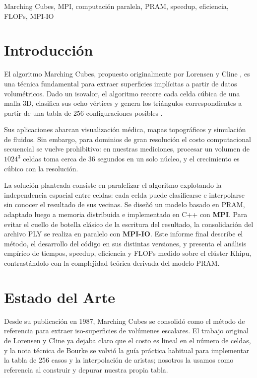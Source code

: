 \documentclass[conference]{IEEEtran}
\begin{document}
\begin{IEEEkeywords}
Marching Cubes, MPI, computación paralela, PRAM, speedup, eficiencia, FLOPs, MPI-IO
\end{IEEEkeywords}

\section{Introducción}

El algoritmo Marching Cubes, propuesto originalmente por Lorensen y Cline \cite{b1}, es una técnica fundamental para extraer superficies implícitas a partir de datos volumétricos. Dado un isovalor, el algoritmo recorre cada celda cúbica de una malla 3D, clasifica sus ocho vértices y genera los triángulos correspondientes a partir de una tabla de 256 configuraciones posibles \cite{b2}.

Sus aplicaciones abarcan visualización médica, mapas topográficos y simulación de fluidos. Sin embargo, para dominios de gran resolución el costo computacional secuencial se vuelve prohibitivo: en nuestras mediciones, procesar un volumen de $1024^3$ celdas toma cerca de 36 segundos en un solo núcleo, y el crecimiento es cúbico con la resolución.

La solución planteada consiste en paralelizar el algoritmo explotando la independencia espacial entre celdas: cada celda puede clasificarse e interpolarse sin conocer el resultado de sus vecinas. Se diseñó un modelo basado en PRAM, adaptado luego a memoria distribuida e implementado en C++ con \textbf{MPI}. Para evitar el cuello de botella clásico de la escritura del resultado, la consolidación del archivo PLY se realiza en paralelo con \textbf{MPI-IO}. Este informe final describe el método, el desarrollo del código en sus distintas versiones, y presenta el análisis empírico de tiempos, speedup, eficiencia y FLOPs medido sobre el clúster Khipu, contrastándolo con la complejidad teórica derivada del modelo PRAM.

\section{Estado del Arte}

Desde su publicación en 1987, Marching Cubes se consolidó como el método de referencia para extraer iso-superficies de volúmenes escalares. El trabajo original de Lorensen y Cline \cite{b1} ya dejaba claro que el costo es lineal en el número de celdas, y la nota técnica de Bourke \cite{b4} se volvió la guía práctica habitual para implementar la tabla de 256 casos y la interpolación de aristas; nosotros la usamos como referencia al construir y depurar nuestra propia tabla.
\end{document}
